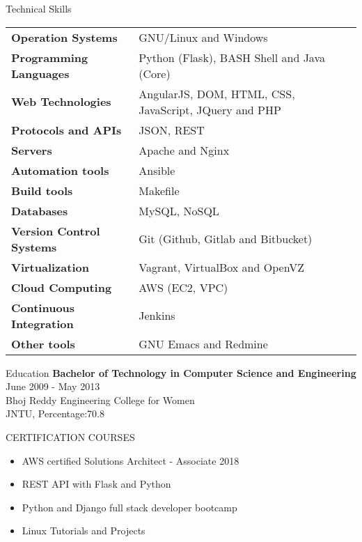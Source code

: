 \documentclass{resume} %
\begin{document}
\begin{rSection}
  {Technical Skills}

  \begin{tabular}{ @{} >{\bfseries}l @{\hspace{2ex}} l }
    Operation Systems & GNU/Linux and Windows \\ Programming
    Languages & Python (Flask), BASH Shell and Java (Core)
    \\ Web Technologies & AngularJS, DOM, HTML, CSS,
    JavaScript, JQuery and PHP\\ Protocols and APIs & JSON,
    REST \\ Servers & Apache and Nginx\\ Automation tools &
    Ansible \\ Build tools & Makefile \\ Databases & MySQL,
    NoSQL \\ Version Control Systems & Git (Github, Gitlab
    and Bitbucket) \\ Virtualization & Vagrant, VirtualBox
    and OpenVZ \\ Cloud Computing & AWS (EC2, VPC)
    \\ Continuous Integration & Jenkins
    \\ Other tools & GNU Emacs and Redmine
    
  \end{tabular}

\end{rSection}



\begin{rSection}{Education}
  {\bf Bachelor of Technology in Computer Science and Engineering} \hfill {June 2009 - May 2013}
  \\ 
  Bhoj Reddy Engineering College for Women
  \\
  JNTU,  Percentage:70.8  
  

\end{rSection}

\begin{rSection}{CERTIFICATION COURSES}
  \begin{itemize}
  \item AWS certified Solutions Architect - Associate 2018 
  \item REST API with Flask and Python
  \item Python and Django full stack developer bootcamp
  \item Linux Tutorials and Projects
    
  \end{itemize}

\end{rSection}
\end{document}

